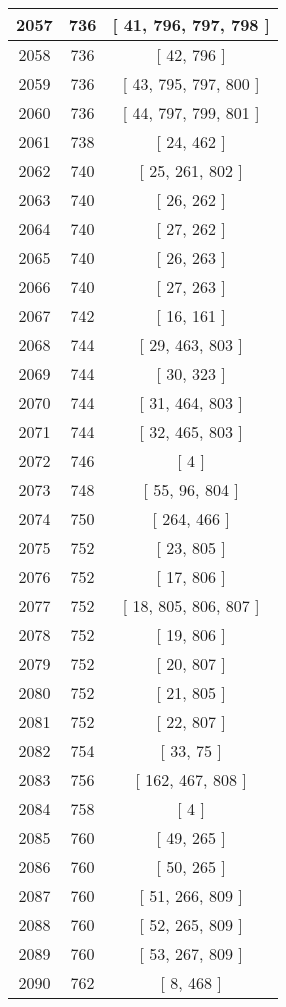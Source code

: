 \begin{center}
\begin{longtable}[H]{|| c c c ||}
\hline
2057 & 736 & [ 41, 796, 797, 798 ] \\ 
\hline
2058 & 736 & [ 42, 796 ] \\ 
\hline
2059 & 736 & [ 43, 795, 797, 800 ] \\ 
\hline
2060 & 736 & [ 44, 797, 799, 801 ] \\ 
\hline
2061 & 738 & [ 24, 462 ] \\ 
\hline
2062 & 740 & [ 25, 261, 802 ] \\ 
\hline
2063 & 740 & [ 26, 262 ] \\ 
\hline
2064 & 740 & [ 27, 262 ] \\ 
\hline
2065 & 740 & [ 26, 263 ] \\ 
\hline
2066 & 740 & [ 27, 263 ] \\ 
\hline
2067 & 742 & [ 16, 161 ] \\ 
\hline
2068 & 744 & [ 29, 463, 803 ] \\ 
\hline
2069 & 744 & [ 30, 323 ] \\ 
\hline
2070 & 744 & [ 31, 464, 803 ] \\ 
\hline
2071 & 744 & [ 32, 465, 803 ] \\ 
\hline
2072 & 746 & [ 4 ] \\ 
\hline
2073 & 748 & [ 55, 96, 804 ] \\ 
\hline
2074 & 750 & [ 264, 466 ] \\ 
\hline
2075 & 752 & [ 23, 805 ] \\ 
\hline
2076 & 752 & [ 17, 806 ] \\ 
\hline
2077 & 752 & [ 18, 805, 806, 807 ] \\ 
\hline
2078 & 752 & [ 19, 806 ] \\ 
\hline
2079 & 752 & [ 20, 807 ] \\ 
\hline
2080 & 752 & [ 21, 805 ] \\ 
\hline
2081 & 752 & [ 22, 807 ] \\ 
\hline
2082 & 754 & [ 33, 75 ] \\ 
\hline
2083 & 756 & [ 162, 467, 808 ] \\ 
\hline
2084 & 758 & [ 4 ] \\ 
\hline
2085 & 760 & [ 49, 265 ] \\ 
\hline
2086 & 760 & [ 50, 265 ] \\ 
\hline
2087 & 760 & [ 51, 266, 809 ] \\ 
\hline
2088 & 760 & [ 52, 265, 809 ] \\ 
\hline
2089 & 760 & [ 53, 267, 809 ] \\ 
\hline
2090 & 762 & [ 8, 468 ] \\ 

\end{longtable}
\end{center}
